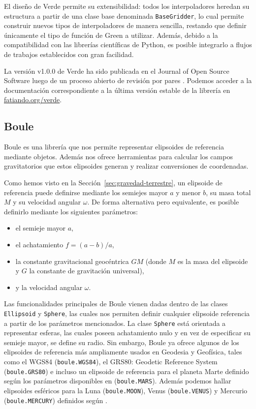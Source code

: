 El diseño de Verde permite su extensibilidad: todos los interpoladores
heredan su estructura a partir de una clase base denominada
\texttt{BaseGridder}, lo cual permite construir nuevos tipos de
interpoladores de manera sencilla, restando que definir únicamente el tipo de
función de Green a utilizar.
Además, debido a la compatibilidad con las librerías científicas de Python, es
posible integrarlo a flujos de trabajos establecidos con gran facilidad.

La versión v1.0.0 de Verde ha sido publicada en el Journal of Open
Source Software luego de un proceso abierto de revisión por pares
\citep{verde2018}.
Podemos acceder a la documentación correspondiente a la última versión estable
de la librería en \href{https://www.fatiando.org/verde}{fatiando.org/verde}.


\subsection{Boule}
\label{sec:boule}

Boule es una librería que nos permite representar elipsoides de
referencia mediante objetos. Además nos ofrece herramientas para calcular los
campos gravitatorios que estos elipsoides generan y realizar conversiones
de coordenadas.

Como hemos visto en la Sección~\ref{sec:gravedad-terrestre}, un elipsoide de
referencia puede definirse mediante los semiejes mayor $a$ y menor $b$, su masa
total $M$ y su velocidad angular $\omega$.
De forma alternativa pero equivalente, es posible definirlo mediante los
siguientes parámetros:
%
\begin{itemize}
    \item el semieje mayor $a$,
    \item el achatamiento $f = (a - b) / a$,
    \item la constante gravitacional geocéntrica $GM$ (donde $M$ es la masa
        del elipsoide y $G$ la constante de gravitación universal),
    \item y la velocidad angular $\omega$.
\end{itemize}

Las funcionalidades principales de Boule vienen dadas dentro de las clases
\texttt{Ellipsoid} y \texttt{Sphere}, las cuales nos permiten definir
cualquier elipsoide referencia a partir de los parámetros mencionados.
La clase \texttt{Sphere} está orientada a representar esferas, las cuales
poseen achatamiento nulo y en vez de especificar su semieje mayor, se define su
radio.
Sin embargo, Boule ya ofrece algunos de los elipsoides de referencia más
ampliamente usados en Geodesia y Geofísica, tales como el WGS84
(\texttt{boule.WGS84}), el GRS80: Geodetic Reference System
(\texttt{boule.GRS80}) e incluso un elipsoide de referencia para el planeta
Marte definido según los parámetros disponibles en \citet{ardalan2009}
(\texttt{boule.MARS}).
Además podemos hallar elipsoides esféricos para la Luna (\texttt{boule.MOON}),
Venus (\texttt{boule.VENUS}) y Mercurio (\texttt{boule.MERCURY}) definidos
según \citet{wieczorek2015}.

